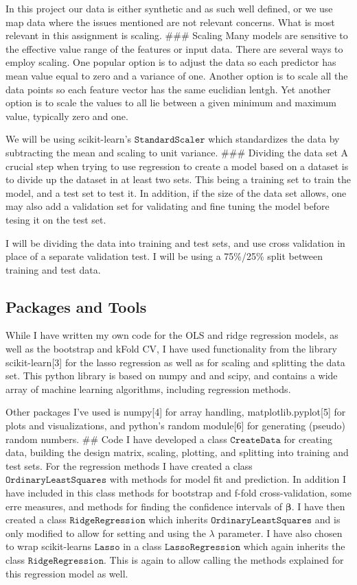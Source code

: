 \documentclass[11pt]{article}
\begin{document}
In this project our data is either synthetic and as such well defined,
or we use map data where the issues mentioned are not relevant concerns.
What is most relevant in this assignment is scaling. \#\#\# Scaling Many
models are sensitive to the effective value range of the features or
input data. There are several ways to employ scaling. One popular option
is to adjust the data so each predictor has mean value equal to zero and
a variance of one. Another option is to scale all the data points so
each feature vector has the same euclidian lentgh. Yet another option is
to scale the values to all lie between a given minimum and maximum
value, typically zero and one.

We will be using scikit-learn's \(\texttt{StandardScaler}\) which
standardizes the data by subtracting the mean and scaling to unit
variance. \#\#\# Dividing the data set A crucial step when trying to use
regression to create a model based on a dataset is to divide up the
dataset in at least two sets. This being a training set to train the
model, and a test set to test it. In addition, if the size of the data
set allows, one may also add a validation set for validating and fine
tuning the model before tesing it on the test set.

I will be dividing the data into training and test sets, and use cross
validation in place of a separate validation test. I will be using a
75\%/25\% split between training and test data.

    \hypertarget{packages-and-tools}{%
\subsection{Packages and Tools}\label{packages-and-tools}}

While I have written my own code for the OLS and ridge regression
models, as well as the bootstrap and kFold CV, I have used functionality
from the library scikit-learn{[}3{]} for the lasso regression as well as
for scaling and splitting the data set. This python library is based on
numpy and and scipy, and contains a wide array of machine learning
algorithms, including regression methods.

Other packages I've used is numpy{[}4{]} for array handling,
matplotlib.pyplot{[}5{]} for plots and visualizations, and python's
random module{[}6{]} for generating (pseudo) random numbers. \#\# Code I
have developed a class \(\texttt{CreateData}\) for creating data,
building the design matrix, scaling, plotting, and splitting into
training and test sets. For the regression methods I have created a
class \(\texttt{OrdinaryLeastSquares}\) with methods for model fit and
prediction. In addition I have included in this class methods for
bootstrap and f-fold cross-validation, some erre measures, and methods
for finding the confidence intervals of \(\boldsymbol{\beta}\). I have
then created a class \(\texttt{RidgeRegression}\) which inherits
\(\texttt{OrdinaryLeastSquares}\) and is only modified to allow for
setting and using the \(\lambda\) parameter. I have also chosen to wrap
scikit-learns \(\texttt{Lasso}\) in a class \(\texttt{LassoRegression}\)
which again inherits the class \(\texttt{RidgeRegression}\). This is
again to allow calling the methods explained for this regression model
as well.
\end{document}
